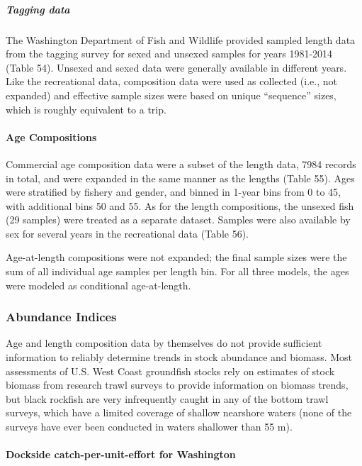 \documentclass[11pt,
  english,
  letterpaper,
]{article}
\begin{document}
\hypertarget{tagging-data}{%
\subparagraph{Tagging data}\label{tagging-data}}

The Washington Department of Fish and Wildlife provided sampled length data from the tagging survey for sexed and unsexed samples for years 1981-2014 (Table 54). Unsexed and sexed data were generally available in different years. Like the recreational data, composition data were used as collected (i.e., not expanded) and effective sample sizes were based on unique ``sequence'' sizes, which is roughly equivalent to a trip.

\hypertarget{age-compositions}{%
\paragraph{Age Compositions}\label{age-compositions}}

Commercial age composition data were a subset of the length data, 7984 records in total, and were expanded in the same manner as the lengths (Table 55). Ages were stratified by fishery and gender, and binned in 1-year bins from 0 to 45, with additional bins 50 and 55. As for the length compositions, the unsexed fish (29 samples) were treated as a separate dataset. Samples were also available by sex for several years in the recreational data (Table 56).

Age-at-length compositions were not expanded; the final sample sizes were the sum of all individual age samples per length bin. For all three models, the ages were modeled as conditional age-at-length.

\hypertarget{abundance-indices}{%
\subsubsection{Abundance Indices}\label{abundance-indices}}

Age and length composition data by themselves do not provide sufficient information to reliably determine trends in stock abundance and biomass. Most assessments of U.S. West Coast groundfish stocks rely on estimates of stock biomass from research trawl surveys to provide information on biomass trends, but black rockfish are very infrequently caught in any of the bottom trawl surveys, which have a limited coverage of shallow nearshore waters (none of the surveys have ever been conducted in waters shallower than 55 m).

\hypertarget{dockside-catch-per-unit-effort-for-washington}{%
\paragraph{Dockside catch-per-unit-effort for Washington}\label{dockside-catch-per-unit-effort-for-washington}}
\end{document}
